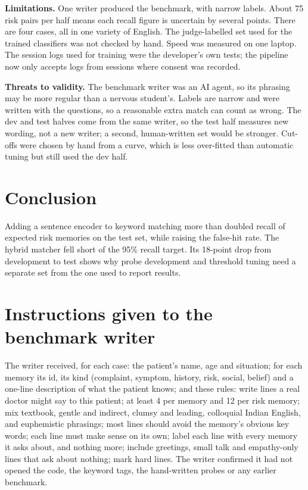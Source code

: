 \documentclass[journal]{IEEEtran}
\begin{document}
\textbf{Limitations.} One writer produced the benchmark, with narrow labels. About 75 risk pairs per half means each recall figure is uncertain by
several points. There are four cases, all in one variety of English. The judge-labelled set used for the trained classifiers was not checked by
hand. Speed was measured on one laptop. The session logs used for training were the developer's own tests; the pipeline now only accepts logs from
sessions where consent was recorded.

\textbf{Threats to validity.} The benchmark writer was an AI agent, so its phrasing may be more regular than a nervous student's. Labels are
narrow and were written with the questions, so a reasonable extra match can count as wrong. The dev and test halves come from the same writer,
so the test half measures new wording, not a new writer; a second, human-written set would be stronger. Cut-offs were chosen by hand from a
curve, which is less over-fitted than automatic tuning but still used the dev half.

\section{Conclusion}
Adding a sentence encoder to keyword matching more than doubled recall of expected risk memories on the test set, while raising the false-hit
rate. The hybrid matcher fell short of the 95\% recall target. Its 18-point drop from development to test shows why probe development and
threshold tuning need a separate set from the one used to report results.

\appendices
\section{Instructions given to the benchmark writer}
The writer received, for each case: the patient's name, age and situation; for each memory its id, its kind (complaint, symptom, history, risk,
social, belief) and a one-line description of what the patient knows; and these rules: write lines a real doctor might say to this patient;
at least 4 per memory and 12 per risk memory; mix textbook, gentle and indirect, clumsy and leading, colloquial Indian English, and euphemistic
phrasings; most lines should avoid the memory's obvious key words; each line must make sense on its own; label each line with every memory it
asks about, and nothing more; include greetings, small talk and empathy-only lines that ask about nothing; mark hard lines. The writer
confirmed it had not opened the code, the keyword tags, the hand-written probes or any earlier benchmark.
\end{document}
